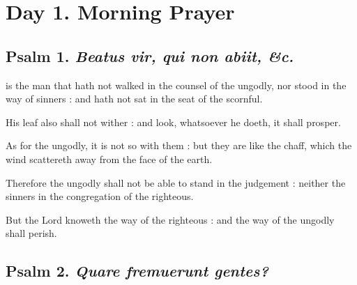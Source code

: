 \section*{Day 1. Morning Prayer}

\subsection{Psalm 1. \textit{Beatus vir, qui non abiit, \&c.}}

 is the man that hath not walked in the counsel of the ungodly, nor stood in the way of sinners : and hath not sat in the seat of the scornful.\par
{}
His leaf also shall not wither : and look, whatsoever he doeth, it shall prosper.\par
{}As for the ungodly, it is not so with them : but they are like the chaff, which the wind scattereth away from the face of the earth.\par
{}Therefore the ungodly shall not be able to stand in the judgement : neither the sinners in the congregation of the righteous.\par
{}But the Lord knoweth the way of the righteous : and the way of the ungodly shall perish.\par

\subsection{Psalm 2. \textit{Quare fremuerunt gentes?}}

